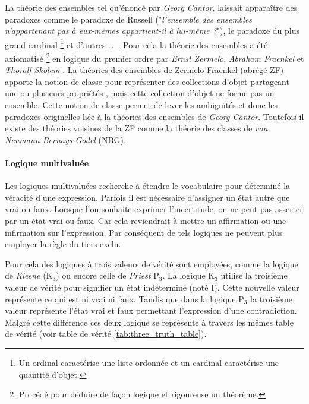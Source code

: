 \begin{refsegment}
\begin{shadedfigure}[H]
    \end{shadedfigure}

    La théorie des ensembles tel qu'énoncé par \textit{Georg Cantor}, laissait apparaître des paradoxes comme le paradoxe de Russell ("\textit{l'ensemble des ensembles n'appartenant pas à eux-mêmes appartient-il à lui-même ?}"), le paradoxe du plus grand cardinal \footnote{Un ordinal caractérise une liste ordonnée et un cardinal caractérise une quantité d'objet.} et d'autres \ldots~. Pour cela la théorie des ensembles a été axiomatisé \footnote{Procédé pour déduire de façon logique et rigoureuse un théorème.} en logique du premier ordre par \textit{Ernst Zermelo}, \textit{ Abraham Fraenkel} et \textit{Thoralf Skolem} \cite{hayden1968zermelo,kanamori2008higher}. La théories des ensembles de Zermelo-Fraenkel (abrégé ZF) apporte la notion de classe pour représenter des collections d'objet partageant une ou plusieurs propriétés , mais cette collection d'objet ne forme pas un ensemble. Cette notion de classe permet de lever les ambiguïtés et donc les paradoxes originelles liée à la théories des ensembles de \textit{Georg Cantor}. Toutefois il existe des théories voisines de la ZF comme la théorie des classes \cite{bernays1937system,van1967frege} de \textit{von Neumann-Bernays-Gödel} (NBG).

        
    \paragraph{Logique multivaluée}\label{par:logic_multivalué}
    
    Les logiques multivaluées recherche à étendre le vocabulaire pour déterminé la véracité d'une expression. Parfois il est nécessaire d'assigner un état autre que vrai ou faux. Lorsque l'on souhaite exprimer l'incertitude, on ne peut pas asserter par un état vrai ou faux. Car cela reviendrait à mettre un affirmation ou une infirmation sur l'expression. Par conséquent de tels logiques ne peuvent plus employer la règle du tiers exclu.
    
    Pour cela des logiques à trois valeurs de vérité sont employées, comme la logique de \textit{Kleene} (K$_{3}$) ou encore celle de \textit{Priest} P$_{3}$. La logique K$_{3}$ utilise la troisième valeur de vérité pour signifier un état indéterminé (noté I).  Cette nouvelle valeur représente ce qui est ni vrai ni faux.  Tandis que dans la logique P$_{3}$ la troisième valeur représente l'état vrai et faux permettant l'expression d'une contradiction. Malgré cette différence ces deux logique se représente à travers les mêmes table de vérité (voir table de vérité \ref{tab:three_truth_table}).
    

\end{refsegment}
